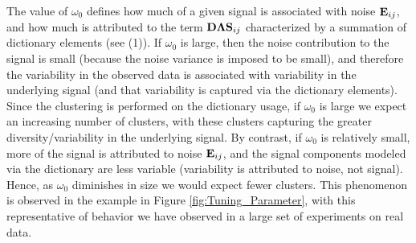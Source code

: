 \documentclass[journal]{IEEEtran}
\begin{document}
The value of $\omega_0$ defines how much of a given signal is associated with noise ${\mathbf E}_{ij}$, and how much is attributed to the term ${\mathbf D}\boldsymbol{\Lambda}{\mathbf S}_{ij}$ characterized by a summation of dictionary elements (see (1)). If $\omega_0$ is large, then the noise contribution to the signal is small (because the noise variance is imposed to be small), and therefore the variability in the observed data is associated with variability in the underlying signal (and that variability is captured via the dictionary elements). Since the clustering is performed on the dictionary usage, if $\omega_0$ is large we expect an increasing number of clusters, with these clusters capturing the greater diversity/variability in the underlying signal. By contrast, if $\omega_0$ is relatively small, more of the signal is attributed to noise ${\mathbf E}_{ij}$, and the signal components modeled via the dictionary are less variable (variability is attributed to noise, not signal). Hence, as $\omega_0$ diminishes in size we would expect fewer clusters. This phenomenon is observed in the example in Figure \ref{fig:Tuning_Parameter}, with this representative of behavior we have observed in a large set of experiments on real data.
\end{document}
